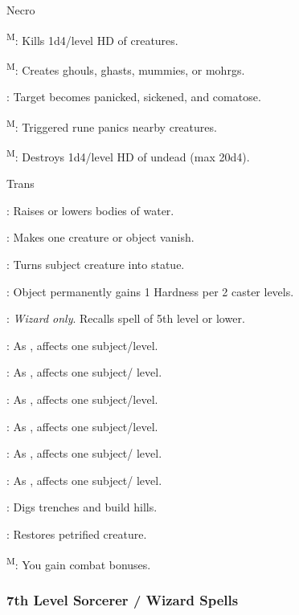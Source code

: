 Necro

\textsuperscript{M}: Kills 1d4/level 
HD of creatures.

\textsuperscript{M}: Creates ghouls, ghasts, mummies, or mohrgs.

: Target becomes panicked, sickened, and comatose.

\textsuperscript{M}: Triggered rune panics nearby creatures.

\textsuperscript{M}: Destroys 1d4/level HD of undead (max 20d4).

Trans

: Raises or lowers bodies of water.

: Makes one creature or object vanish.

: Turns subject creature into statue.

: Object permanently gains 1 Hardness per 2 caster levels.

: \textit{Wizard only}. Recalls spell of 5th level or lower.

: As , affects one subject/level.

: As , affects one subject/ level.

: As , affects one subject/level.

: As , affects one subject/level.

: As , affects one subject/ level.

: As , affects one subject/ level.

: Digs trenches and build hills.

: Restores petrified creature.

\textsuperscript{M}: You gain combat bonuses.

\subsubsection{7th Level Sorcerer / Wizard Spells}

